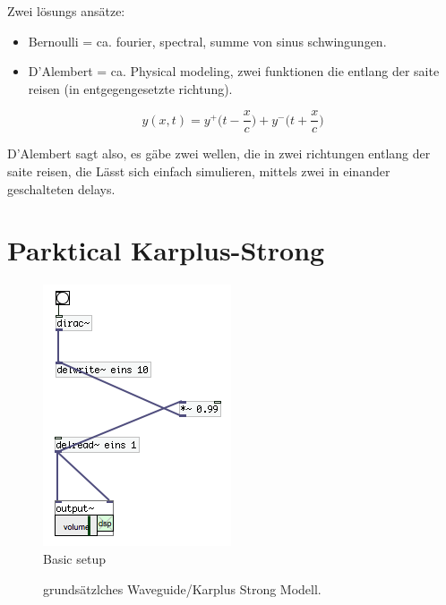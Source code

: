 Zwei lösungs ansätze: 
\begin{itemize}
	\item Bernoulli = ca. fourier, spectral, summe von sinus schwingungen.
	\item D'Alembert = ca. Physical modeling, zwei funktionen die entlang der saite reisen (in entgegengesetzte richtung).
\end{itemize}


\begin{equation}
y(x, t) = y ^+ \Bigg(t - \frac{x}{c}\Bigg) + y^- \Bigg(t + \frac{x}{c} \Bigg)
\end{equation}

D'Alembert sagt also, es gäbe zwei wellen, die in zwei richtungen entlang der saite reisen, die Lässt sich einfach simulieren, mittels zwei in einander geschalteten delays.

\section{Parktical Karplus-Strong}
\begin{figure}[h]
	\begin{center}
		\includegraphics[scale = 1.]{img/karplusSimple.png}
		\caption{Basic setup}
		\label{fig:karplusBasic}
	\end{center}
\end{figure}

  \begin{figure}[htb]
  \centering  
  \caption{grundsätzlches Waveguide/Karplus Strong Modell.}
  \label{fig:string}

\end{figure}

